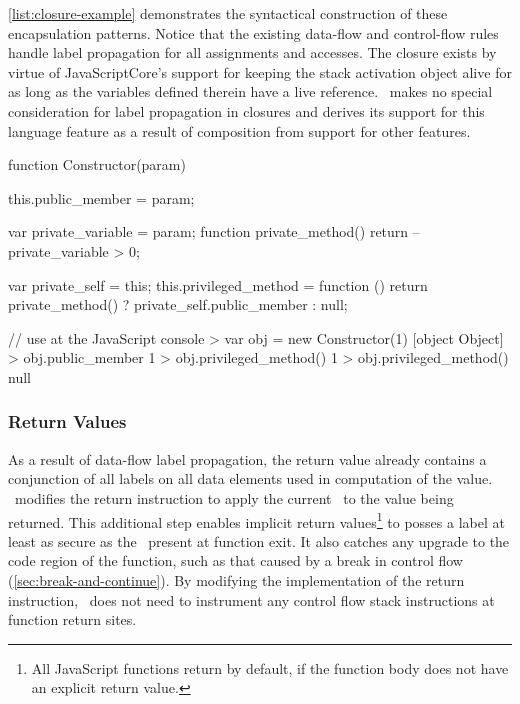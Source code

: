 \autoref{list:closure-example} demonstrates the syntactical construction of these encapsulation patterns.
Notice that the existing data-flow and control-flow rules handle label propagation for all assignments and accesses.
The closure exists by virtue of JavaScriptCore's support for keeping the stack activation object alive for as long as the variables defined therein have a live reference.
\FlowCore\ makes no special consideration for label propagation in closures and derives its support for this language feature as a result of composition from support for other features.

\begin{jscode}
function Constructor(param) {
    this.public_member = param;

    var private_variable = param;
    function private_method() {
        return --private_variable > 0;
    }

    var private_self = this;
    this.privileged_method = function () {
        return private_method() ? private_self.public_member : null;
    }
}

// use at the JavaScript console
> var obj = new Constructor(1)
[object Object]
> obj.public_member
1
> obj.privileged_method()
1
> obj.privileged_method()
null
\end{jscode}

\subsubsection{Return Values}

As a result of data-flow label propagation, the return value already contains a conjunction of all labels on all data elements used in computation of the value.
\FlowCore\ modifies the return instruction to apply the current \pclabel\ to the value being returned.
This additional step enables implicit return values\footnote{All JavaScript functions return  by default, if the function body does not have an explicit return value.} to posses a label at least as secure as the \pclabel\ present at function exit.
It also catches any upgrade to the code region of the function, such as that caused by a break in control flow (\autoref{sec:break-and-continue}).
By modifying the implementation of the return instruction, \FlowCore\ does not need to instrument any control flow stack instructions at function return sites.

